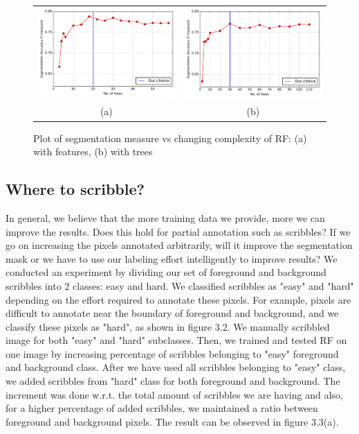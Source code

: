 \begin{figure}[h!] \label{fig:rf_complex}
\begin{tabular}{cc}
 \includegraphics[width=0.5\linewidth]{figures/diff_features.pdf} & \includegraphics[width=0.5\linewidth]{figures/diff_trees.pdf} \\
  (a)  & (b) \\
\end{tabular}
\caption{Plot of segmentation measure vs changing complexity of RF: (a) with features, (b) with trees}
\end{figure}


\subsection{Where to scribble?}
In general, we believe that the more training data we provide, more we can improve the results. Does this hold for partial annotation such as scribbles? If we go on increasing the pixels annotated arbitrarily, will it improve the segmentation mask or we have to use our labeling effort intelligently to improve results? We conducted an experiment by dividing our set of foreground and background scribbles into 2 classes: easy and hard. We classified scribbles as "easy" and "hard" depending on the effort required to annotate these pixels. For example, pixels are difficult to annotate near the boundary of foreground and background, and we classify these pixels as "hard", as shown in figure 3.2. We manually scribbled image for both "easy" and "hard" subclasses. Then, we trained and tested RF on one image by increasing percentage of scribbles belonging to "easy" foreground and background class. After we have used all scribbles belonging to "easy" class, we added scribbles from "hard" class for both foreground and background. The increment was done w.r.t. the total amount of scribbles we are having and also, for a higher percentage of added scribbles, we maintained a ratio between foreground and background pixels. The result can be observed in figure 3.3(a). \par


